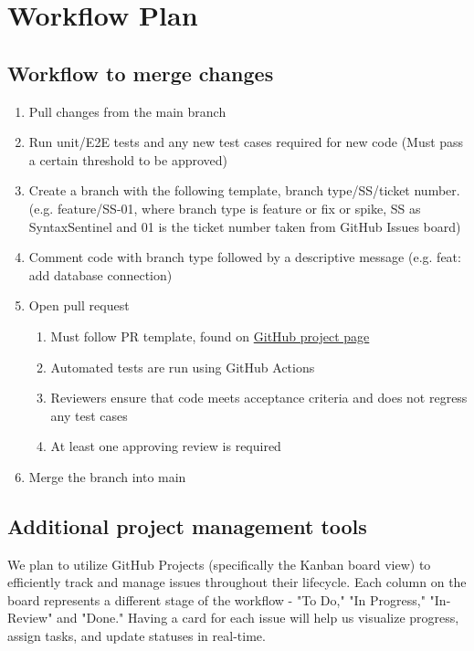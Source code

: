 \documentclass{article}
\begin{document}
\section{Workflow Plan}

\subsection{Workflow to merge changes}
\begin{enumerate}
    \item Pull changes from the main branch
    \item Run unit/E2E tests and any new test cases required for new code (Must pass a certain threshold to be approved)
    \item Create a branch with the following template, branch type/SS/ticket number. (e.g. feature/SS-01, where branch type is feature or fix or spike, SS as SyntaxSentinel and 01 is the ticket number taken from GitHub Issues board)
    \item Comment code with branch type followed by a descriptive message (e.g. feat: add database connection)
    \item Open pull request
        \begin{enumerate}
            \item Must follow PR template, found on \href{https://github.com/lilweege/SyntaxSentinels/blob/main/.github/pull_request_template.md}{GitHub project page}
            \item Automated tests are run using GitHub Actions
            \item Reviewers ensure that code meets acceptance criteria and does not regress any test cases
            \item At least one approving review is required
        \end{enumerate}
    \item Merge the branch into main
\end{enumerate}


\subsection{Additional project management tools}

We plan to utilize GitHub Projects (specifically the Kanban board view) to 
efficiently track and manage issues throughout their lifecycle. Each column 
on the board represents a different stage of the workflow - "To Do," 
"In Progress," "In-Review" and "Done." Having a card for each issue will help us 
visualize progress, assign tasks, and update statuses in real-time.
\end{document}
